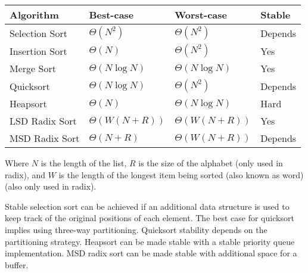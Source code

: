 \begin{solution}
{
\renewcommand{\arraystretch}{2}
\setlength{\tabcolsep}{12pt}
\begin{tabularx}{\textwidth}{Xlll}
Algorithm         & Best-case          & Worst-case          & Stable \\\hline
Selection Sort    & $\Theta(N^2)$      & $\Theta(N^2)$       & Depends\\
Insertion Sort    & $\Theta(N)$        & $\Theta(N^2)$       & Yes    \\
Merge Sort        & $\Theta(N \log N)$ & $\Theta(N \log N)$  & Yes    \\
Quicksort         & $\Theta(N \log N)$        & $\Theta(N^2)$       & Depends\\
Heapsort          & $\Theta(N)$        & $\Theta(N \log N)$  & Hard   \\
LSD Radix Sort    & $\Theta(W(N + R))$ & $\Theta(W(N + R))$  & Yes    \\
MSD Radix Sort    & $\Theta(N + R)$    & $\Theta(W(N + R))$  & Depends\\
\end{tabularx}
}

Where $N$ is the length of the list, $R$ is the size of the alphabet (only used in radix),
and $W$ is the length of the longest item being sorted (also known as word) (also only used in radix).

Stable selection sort can be achieved if an additional data structure is used
to keep track of the original positions of each element. The best case for
quicksort implies using three-way partitioning. Quicksort stability depends on
the partitioning strategy. Heapsort can be made stable with a stable priority
queue implementation. MSD radix sort can be made stable with additional space
for a buffer.
\end{solution}